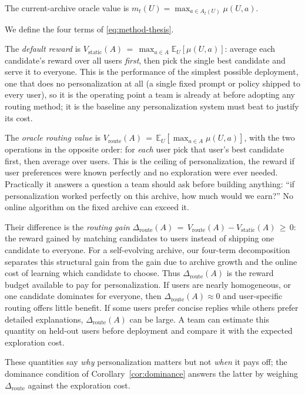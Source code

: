 \documentclass{article} %
\providecommand{\E}{\mathbb{E}}
\begin{document}
The current-archive oracle value is $m_t(U) = \max_{a \in A_t(U)} \mu(U,a)$.

We define the four terms of \eqref{eq:method-thesis}.

The \emph{default reward} is $V_{\mathrm{static}}(A) \,=\, \max_{a \in A} \E_{U}[\mu(U,a)]$: average each candidate's reward over all users \emph{first}, then pick the single best candidate and serve it to everyone. This is the performance of the simplest possible deployment, one that does no personalization at all (a single fixed prompt or policy shipped to every user), so it is the operating point a team is already at before adopting any routing method; it is the baseline any personalization system must beat to justify its cost.

The \emph{oracle routing value} is $V_{\mathrm{route}}(A) \,=\, \E_{U}[\max_{a \in A} \mu(U,a)]$, with the two operations in the opposite order: for \emph{each} user pick that user's best candidate first, then average over users. This is the ceiling of personalization, the reward if user preferences were known perfectly and no exploration were ever needed. Practically it answers a question a team should ask before building anything: ``if personalization worked perfectly on this archive, how much would we earn?'' No online algorithm on the fixed archive can exceed it.

Their difference is the \emph{routing gain} $\Delta_{\mathrm{route}}(A) \,=\, V_{\mathrm{route}}(A) - V_{\mathrm{static}}(A) \,\geq\, 0$: the reward gained by matching candidates to users instead of shipping one candidate to everyone. For a self-evolving archive, our four-term decomposition separates this structural gain from the gain due to archive growth and the online cost of learning which candidate to choose. Thus $\Delta_{\mathrm{route}}(A)$ is the reward budget available to pay for personalization. If users are nearly homogeneous, or one candidate dominates for everyone, then $\Delta_{\mathrm{route}}(A) \approx 0$ and user-specific routing offers little benefit. If some users prefer concise replies while others prefer detailed explanations, $\Delta_{\mathrm{route}}(A)$ can be large. A team can estimate this quantity on held-out users before deployment and compare it with the expected exploration cost.

These quantities say \emph{why} personalization matters but not \emph{when} it pays off; the dominance condition of Corollary~\ref{cor:dominance} answers the latter by weighing $\Delta_{\mathrm{route}}$ against the exploration cost.
\end{document}
